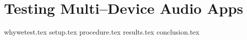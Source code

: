 \chapter{Testing Multi--Device Audio Apps}\label{sec:sota_test}
{whywetest.tex}
{setup.tex}
{procedure.tex}
{results.tex}
{conclusion.tex}
